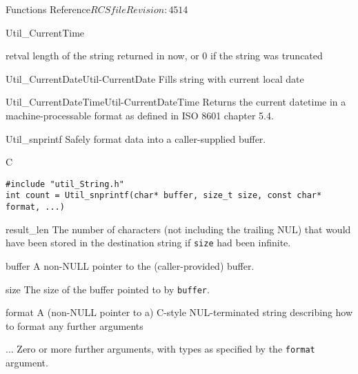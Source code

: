 \begin{cactuspart}{ Functions Reference}{$RCSfile$}{$Revision: 4514 $}
\begin{FunctionDescription}{Util\_CurrentTime}
\begin{ResultSection}
\begin{Result}{retval}
length of the string returned in {\code now}, or 0 if the string was truncated
\end{Result}
\end{ResultSection}

\begin{SeeAlsoSection}
\begin{SeeAlso2}{Util\_CurrentDate}{Util-CurrentDate}
  Fills string with current local date
\end{SeeAlso2}
\begin{SeeAlso2}{Util\_CurrentDateTime}{Util-CurrentDateTime}
  Returns the current datetime in a machine-processable format
as defined in ISO 8601 chapter 5.4.
\end{SeeAlso2}
\end{SeeAlsoSection}

\end{FunctionDescription}


\begin{FunctionDescription}{Util\_snprintf}
\label{Util-snprintf}
Safely format data into a caller-supplied buffer.

\begin{SynopsisSection}
\begin{Synopsis}{C}
\begin{verbatim}
#include "util_String.h"
int count = Util_snprintf(char* buffer, size_t size, const char* format, ...)
\end{verbatim}
\end{Synopsis}
\end{SynopsisSection}

\begin{ResultSection}
\begin{Result}{result\_len}
The number of characters (not including the trailing NUL) that would
have been stored in the destination string if \verb|size| had been infinite.
\end{Result}
\end{ResultSection}

\begin{ParameterSection}
\begin{Parameter}{buffer}
A non-NULL pointer to the (caller-provided) buffer.
\end{Parameter}
\begin{Parameter}{size}
The size of the buffer pointed to by \verb|buffer|.
\end{Parameter}
\begin{Parameter}{format}
A (non-NULL pointer to a) C-style NUL-terminated string describing
how to format any further arguments
\end{Parameter}
\begin{Parameter}{...}
Zero or more further arguments, with types as specified by the
\verb|format| argument.
\end{Parameter}
\end{ParameterSection}


\end{FunctionDescription}
\end{cactuspart}
